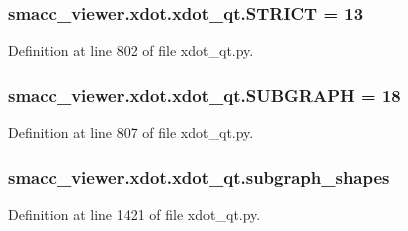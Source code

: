 \subsubsection[{\texorpdfstring{S\+T\+R\+I\+CT}{STRICT}}]{ smacc\+\_\+viewer.\+xdot.\+xdot\+\_\+qt.\+S\+T\+R\+I\+CT = 13}\hypertarget{namespacesmacc__viewer_1_1xdot_1_1xdot__qt_a927da4336a8a38bb4819afd08a6036d6}{}\label{namespacesmacc__viewer_1_1xdot_1_1xdot__qt_a927da4336a8a38bb4819afd08a6036d6}


Definition at line 802 of file xdot\+\_\+qt.\+py.

\subsubsection[{\texorpdfstring{S\+U\+B\+G\+R\+A\+PH}{SUBGRAPH}}]{ smacc\+\_\+viewer.\+xdot.\+xdot\+\_\+qt.\+S\+U\+B\+G\+R\+A\+PH = 18}\hypertarget{namespacesmacc__viewer_1_1xdot_1_1xdot__qt_afb8df3443e998785b9a777725f889afb}{}\label{namespacesmacc__viewer_1_1xdot_1_1xdot__qt_afb8df3443e998785b9a777725f889afb}


Definition at line 807 of file xdot\+\_\+qt.\+py.

\subsubsection[{\texorpdfstring{subgraph\+\_\+shapes}{subgraph_shapes}}]{\setlength{\rightskip}{0pt plus 5cm}smacc\+\_\+viewer.\+xdot.\+xdot\+\_\+qt.\+subgraph\+\_\+shapes}\hypertarget{namespacesmacc__viewer_1_1xdot_1_1xdot__qt_a1adb9f4f58f0f612cafb13be26ea275f}{}\label{namespacesmacc__viewer_1_1xdot_1_1xdot__qt_a1adb9f4f58f0f612cafb13be26ea275f}


Definition at line 1421 of file xdot\+\_\+qt.\+py.

